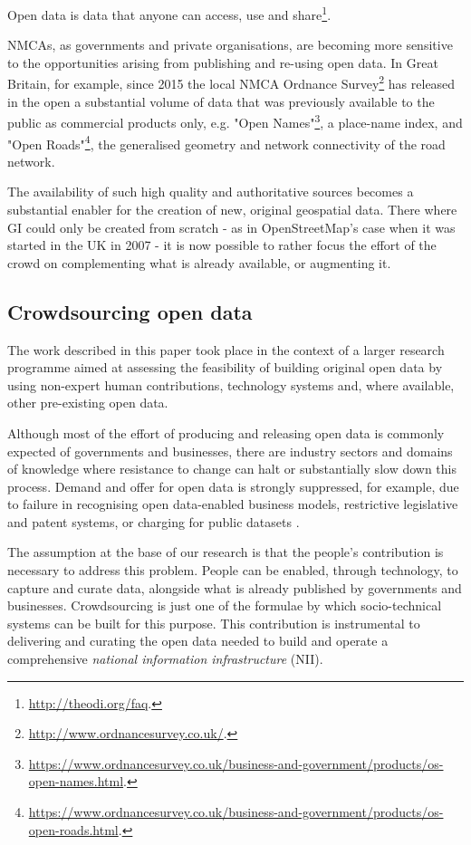     Open data is data that anyone can access, use and share\footnote{\url{http://theodi.org/faq}.}. 
    
    NMCAs, as governments and private organisations, are becoming more sensitive to the opportunities arising from publishing and re-using open data. In Great Britain, for example, since 2015 the local NMCA Ordnance Survey\footnote{\url{http://www.ordnancesurvey.co.uk/}.} has released in the open a substantial volume of data that was previously available to the public as commercial products only, e.g. "Open Names"\footnote{\url{https://www.ordnancesurvey.co.uk/business-and-government/products/os-open-names.html}.}, a place-name index, and "Open Roads"\footnote{\url{https://www.ordnancesurvey.co.uk/business-and-government/products/os-open-roads.html}.}, the generalised geometry and network connectivity of the road network.
    
    The availability of such high quality and authoritative sources becomes a substantial enabler for the creation of new, original geospatial data. There where GI could only be created from scratch - as in OpenStreetMap's case when it was started in the UK in 2007 - it is now possible to rather focus the effort of the crowd on complementing what is already available, or augmenting it.

\subsection{Crowdsourcing open data}

    The work described in this paper took place in the context of a larger research programme aimed at assessing the feasibility of building original open data by using non-expert human contributions, technology systems and, where available, other pre-existing open data. 
    
    Although most of the effort of producing and releasing open data is commonly expected of governments and businesses, there are industry sectors and domains of knowledge where resistance to change can halt or substantially slow down this process. Demand and offer for open data is strongly suppressed, for example, due to failure in recognising open data-enabled business models, restrictive legislative and patent systems, or charging for public datasets \cite{shadboltpaf}. 
    
    The assumption at the base of our research is that the people's contribution is necessary to address this problem. People can be enabled, through technology, to capture and curate data, alongside what is already published by governments and businesses. Crowdsourcing is just one of the formulae by which socio-technical systems can be built for this purpose. This contribution is instrumental to delivering and curating the open data needed to build and operate a comprehensive {\it national information infrastructure} (NII).

